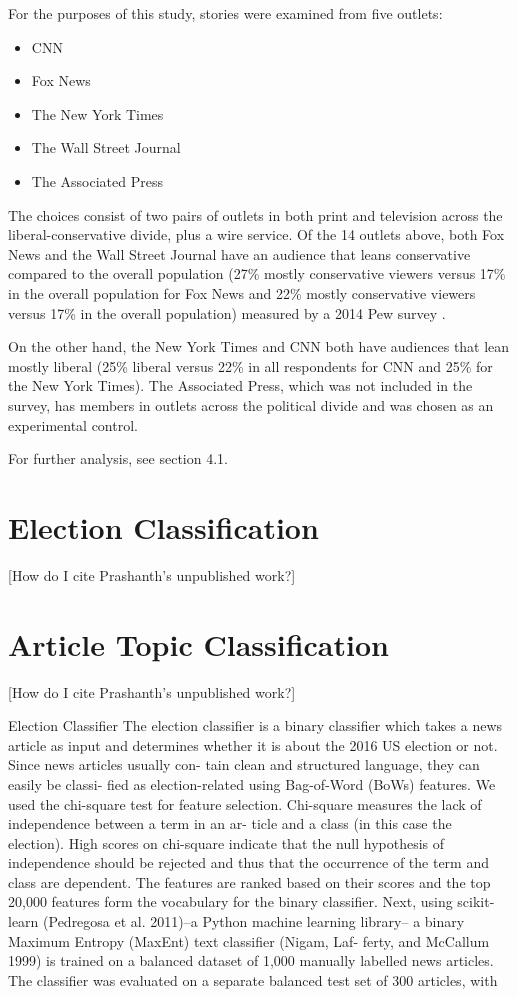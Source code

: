 For the purposes of this study, stories were examined from five outlets: 

\begin{itemize}
\itemsep-1em 
  \item CNN
  \item Fox News  
  \item The New York Times
  \item The Wall Street Journal 
  \item The Associated Press 
\end{itemize}

The choices consist of two pairs of outlets in both print and television across the liberal-conservative divide, plus a wire service. Of the 14 outlets above, both Fox News and the Wall Street Journal have an audience that leans conservative compared to the overall population (27\% mostly conservative viewers versus 17\% in the overall population for Fox News and 22\% mostly conservative viewers versus 17\% in the overall population) measured by a 2014 Pew survey \cite{PoliticalPolarization}.

On the other hand, the New York Times and CNN both have audiences that lean mostly liberal (25\% liberal versus 22\% in all respondents for CNN and 25\% for the New York Times). The Associated Press, which was not included in the survey, has members in outlets across the political divide and was chosen as an experimental control.
 
For further analysis, see section 4.1.

\section{Election Classification}
[How do I cite Prashanth's unpublished work?]

\section{Article Topic Classification}
[How do I cite Prashanth's unpublished work?]
 

Election Classifier
The election classifier is a binary classifier which takes a news article as input and determines whether it is about the 2016 US election or not. Since news articles usually con- tain clean and structured language, they can easily be classi- fied as election-related using Bag-of-Word (BoWs) features. We used the chi-square test for feature selection. Chi-square measures the lack of independence between a term in an ar- ticle and a class (in this case the election). High scores on chi-square indicate that the null hypothesis of independence should be rejected and thus that the occurrence of the term and class are dependent. The features are ranked based on their scores and the top 20,000 features form the vocabulary for the binary classifier. Next, using scikit-learn (Pedregosa et al. 2011)–a Python machine learning library– a binary Maximum Entropy (MaxEnt) text classifier (Nigam, Laf- ferty, and McCallum 1999) is trained on a balanced dataset of 1,000 manually labelled news articles. The classifier was evaluated on a separate balanced test set of 300 articles, with



